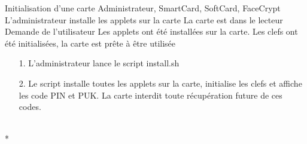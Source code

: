 \documentclass[a4paper,11pt,french]{article}
\begin{document}
\fiche
{Initialisation d'une carte}
	{Administrateur, SmartCard, SoftCard, FaceCrypt}
    {L'administrateur installe les applets sur la carte}
    {La carte est dans le lecteur}
    {Demande de l'utilisateur}
    {Les applets ont été installées sur la carte. Les clefs ont été 
        initialisées, la carte est prête à être utilisée} 
    {\begin{itemize}
        \item[]
        \item[1.] L'administrateur lance le script install.sh
    \end{itemize}}
	{\begin{itemize}
        \item[]
        \item[2.] Le script installe toutes les applets sur la carte,
            initialise les clefs et affiche les code PIN et PUK. La carte
            interdit toute récupération future de ces codes.
	\end{itemize}
	}
	{}
\flots
    {}
    {}
\\*
\end{document}
